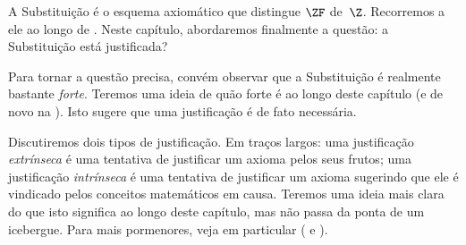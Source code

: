 \documentclass[../../../include/open-logic-section]{subfiles}
\begin{document}

A Substituição é o esquema axiomático que distingue $\ZF$
de~$\Z$. Recorremos a ele ao longo de
. Neste capítulo,
abordaremos finalmente a questão: a Substituição está justificada? 

Para tornar a questão precisa, convém observar que a Substituição é
realmente bastante \emph{forte}. Teremos uma ideia de quão forte é ao longo deste capítulo (e de novo na ). Isto sugere que uma justificação é de fato necessária. 

Discutiremos dois tipos de justificação. Em traços largos: uma justificação \emph{extrínseca} é uma tentativa de justificar um axioma pelos seus frutos; uma justificação \emph{intrínseca} é uma tentativa de justificar um axioma sugerindo que ele é vindicado pelos conceitos matemáticos em causa. Teremos uma ideia mais clara do que isto significa ao longo deste capítulo, mas não passa da ponta de um icebergue. Para mais pormenores, veja em particular \citeauthor{Maddy1988a} (\citeyear{Maddy1988a} e \citeyear{Maddy1988b}).
\end{document}
